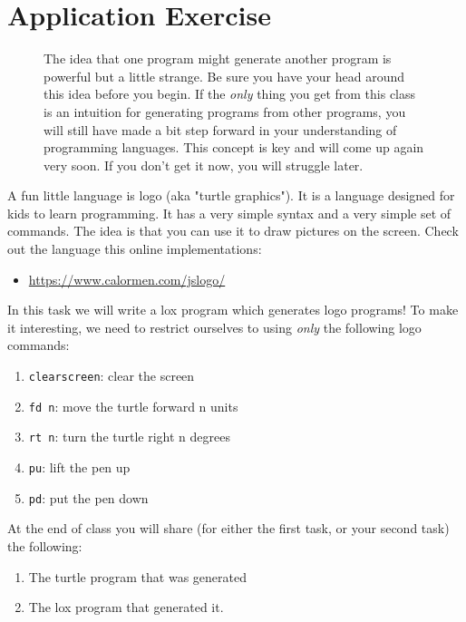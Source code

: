 \documentclass[twoside=false, DIV=14]{scrartcl}
\begin{document}
\newpage
\part*{Application Exercise}

\begin{figure}\begin{aside}
  The idea that one program might generate another program is powerful but a little strange.  Be sure you have your head around this idea before you begin. If the \emph{only} thing you get from this class is an intuition for generating programs from other programs, you will still have made a bit step forward in your understanding of programming languages.  This concept is key and will come up again very soon.  If you don't get it now, you will struggle later.
\end{aside}\end{figure}


A fun little language is logo (aka "turtle graphics").  It is a language designed for kids to learn programming.  It has a very simple syntax and a very simple set of commands.  The idea is that you can use it to draw pictures on the screen.  Check out the language this online implementations:
\begin{itemize}
  \item \url{https://www.calormen.com/jslogo/}
\end{itemize}
In this task we will write a lox program which generates logo programs!  To make it interesting, we need to restrict ourselves to using \emph{only} the following logo commands:
\begin{enumerate}
\item \lstinline|clearscreen|: clear the screen
\item \lstinline|fd n|: move the turtle forward n units
\item \lstinline|rt n|: turn the turtle right n degrees
\item \lstinline|pu|: lift the pen up
\item \lstinline|pd|: put the pen down
\end{enumerate}

At the end of class you will share (for either the first task, or your second task) the following:
\begin{enumerate}
  \item The turtle program that was generated
  \item The lox program that generated it.
\end{enumerate}
\end{document}
